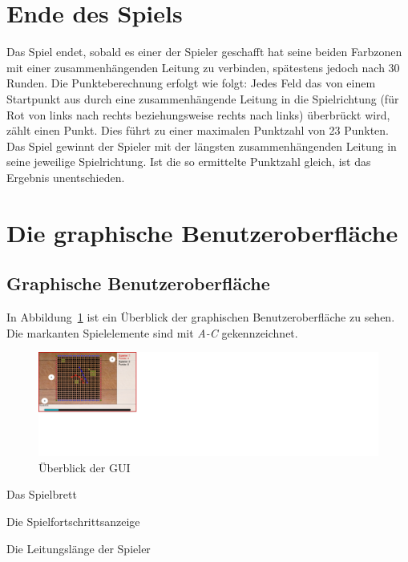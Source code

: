 \documentclass[a4paper, ngerman]{scrartcl}
\begin{document}
\section{Ende des Spiels}

Das Spiel endet, sobald es einer der Spieler geschafft hat seine
beiden Farbzonen mit einer zusammenhängenden Leitung zu verbinden,
spätestens jedoch nach 30 Runden. Die Punkteberechnung erfolgt wie
folgt: Jedes Feld das von einem Startpunkt aus durch eine
zusammenhängende Leitung in die Spielrichtung (für Rot von links nach
rechts beziehungsweise rechts nach links) überbrückt wird, zählt einen
Punkt. Dies führt zu einer maximalen Punktzahl von 23 Punkten. Das
Spiel gewinnt der Spieler mit der längsten zusammenhängenden Leitung
in seine jeweilige Spielrichtung. Ist die so ermittelte Punktzahl
gleich, ist das Ergebnis unentschieden.

\section{Die graphische Benutzeroberfläche}

\subsection{Graphische Benutzeroberfläche}

In Abbildung~\ref{fig:GUI} ist ein Überblick der graphischen
Benutzeroberfläche zu sehen. Die markanten Spielelemente sind mit
\emph{A-C} gekennzeichnet.

\begin{figure}[h!]
  \centering
  \includegraphics[scale = 0.6]{bilder/uebersicht.png}
  \caption{Überblick der GUI}
  \label{fig:GUI}
\end{figure}

\begin{compactenum}[A)]
\item Das Spielbrett
\item Die Spielfortschrittsanzeige
\item Die Leitungslänge der Spieler
\end{compactenum}
\end{document}
